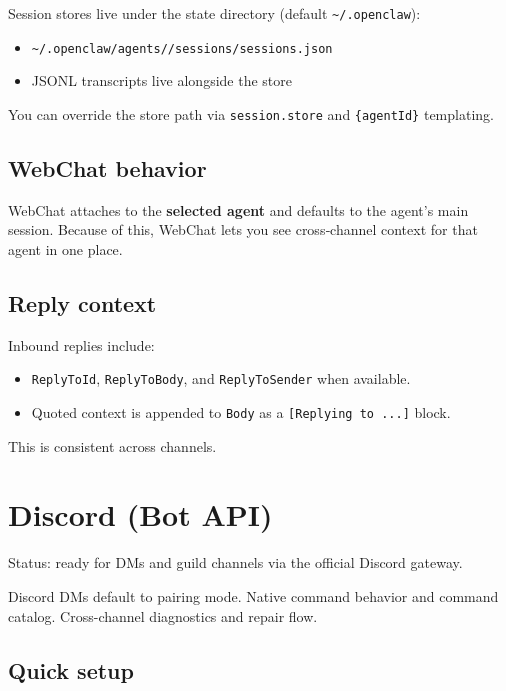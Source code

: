 Session stores live under the state directory (default \texttt{\textasciitilde{}/.openclaw}):

\begin{itemize}
  \item \texttt{\textasciitilde{}/.openclaw/agents//sessions/sessions.json}
  \item JSONL transcripts live alongside the store
\end{itemize}


You can override the store path via \texttt{session.store} and \texttt{\{agentId\}} templating.

\subsection{WebChat behavior}


WebChat attaches to the \textbf{selected agent} and defaults to the agent’s main
session. Because of this, WebChat lets you see cross‑channel context for that
agent in one place.

\subsection{Reply context}


Inbound replies include:

\begin{itemize}
  \item \texttt{ReplyToId}, \texttt{ReplyToBody}, and \texttt{ReplyToSender} when available.
  \item Quoted context is appended to \texttt{Body} as a \texttt{[Replying to ...]} block.
\end{itemize}


This is consistent across channels.


\clearpage

\section{Discord (Bot API)}


Status: ready for DMs and guild channels via the official Discord gateway.

Discord DMs default to pairing mode.
Native command behavior and command catalog.
Cross-channel diagnostics and repair flow.

\subsection{Quick setup}


